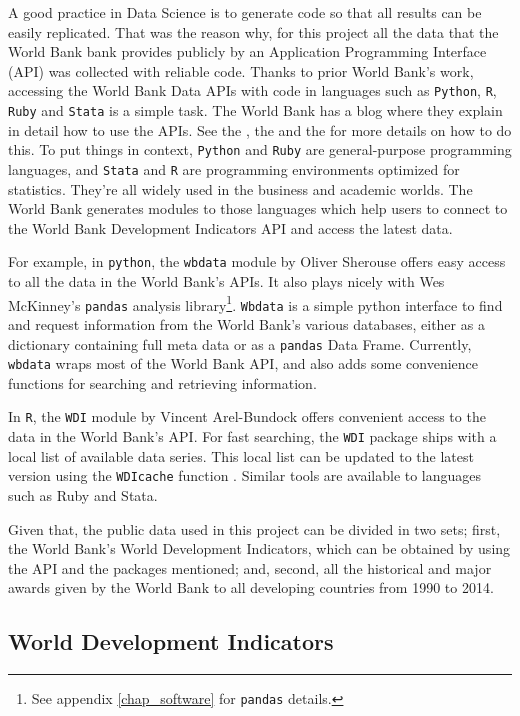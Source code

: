A good practice in Data Science is to generate code so that all results can be easily replicated. That was the reason why, for this project all the data that the World Bank bank provides publicly by an Application Programming Interface (API) was collected with reliable code. Thanks to prior World Bank's work, accessing the World Bank Data APIs with code in languages such as \texttt{Python}, \texttt{R}, \texttt{Ruby} and \texttt{Stata} is a simple task. The World Bank has a blog where they explain in detail how to use the APIs. See the \cite{wb_api}, the \cite{wb_python} and the \cite{wb_r} for more details on how to do this. To put things in context, \texttt{Python} and \texttt{Ruby} are general-purpose programming languages, and \texttt{Stata} and \texttt{R} are programming environments optimized for statistics. They're all widely used in the business and academic worlds. The World Bank generates modules to those languages which help users to connect to the World Bank Development Indicators API and access the latest data.

For example, in \texttt{python}, the \texttt{wbdata} module by Oliver Sherouse offers easy access to all the data in the World Bank's APIs. It also plays nicely with Wes McKinney’s  \texttt{pandas} analysis library\footnote{See appendix \ref{chap_software} for \texttt{pandas} details.}. \texttt{Wbdata} is a simple python interface to find and request information from the World Bank's various databases, either as a dictionary containing full meta data or as a \texttt{pandas} Data Frame. Currently, \texttt{wbdata} wraps most of the World Bank API, and also adds some convenience functions for searching and retrieving information.

In \texttt{R}, the \texttt{WDI} module by Vincent Arel-Bundock offers convenient access to the data in the World Bank's API. For fast searching, the \texttt{WDI} package ships with a local list of available data series. This local list can be updated to the latest version using the \texttt{WDIcache} function \parencite{wb_r}. Similar tools are available to languages such as Ruby and Stata.

Given that, the public data used in this project can be divided in two sets; first, the World Bank's World Development Indicators, which can be obtained by using the API and the packages mentioned; and, second, all the historical and major awards given by the World Bank to all developing countries from 1990 to 2014. 


\subsection{World Development Indicators}

